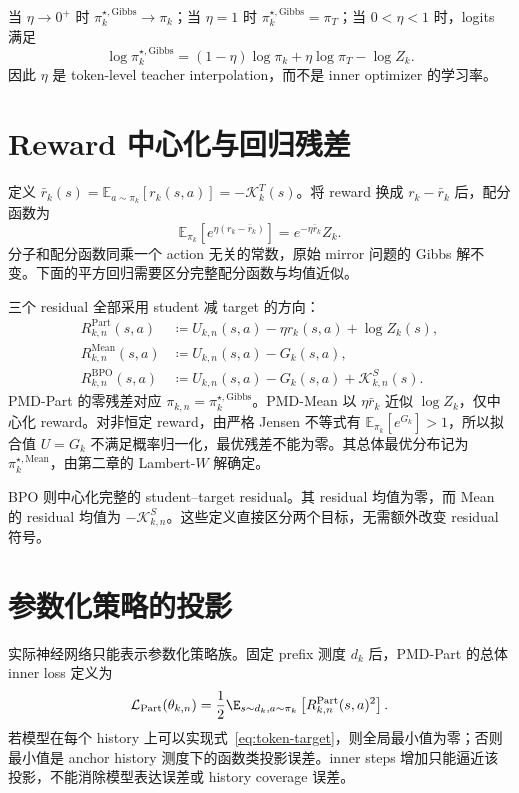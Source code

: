 \begin{corollary}[几何插值与极限]
当 $\eta\to0^+$ 时 $\pi_k^{\star,\mathrm{Gibbs}}\to\pi_k$；当 $\eta=1$ 时 $\pi_k^{\star,\mathrm{Gibbs}}=\pi_T$；当 $0<\eta<1$ 时，logits 满足
\[
 \log \pi_k^{\star,\mathrm{Gibbs}}=(1-\eta)\log\pi_k+\eta\log\pi_T-\log Z_k.
\]
因此 $\eta$ 是 token-level teacher interpolation，而不是 inner optimizer 的学习率。
\end{corollary}

\section{Reward 中心化与回归残差}

定义 $\bar r_k(s)=\mathbb E_{a\sim\pi_k}[r_k(s,a)]=-\mathcal K_k^T(s)$。将 reward 换成 $r_k-\bar r_k$ 后，配分函数为
\[
\mathbb E_{\pi_k}[e^{\eta(r_k-\bar r_k)}]=e^{-\eta\bar r_k}Z_k.
\]
分子和配分函数同乘一个 action 无关的常数，原始 mirror 问题的 Gibbs 解不变。下面的平方回归需要区分完整配分函数与均值近似。

三个 residual 全部采用 student 减 target 的方向：
\begin{align}
R^{\mathrm{Part}}_{k,n}(s,a)&\coloneqq U_{k,n}(s,a)-\eta r_k(s,a)+\log Z_k(s),\label{eq:part-residual}\\
R^{\mathrm{Mean}}_{k,n}(s,a)&\coloneqq U_{k,n}(s,a)-G_k(s,a),\label{eq:mean-residual}\\
R^{\mathrm{BPO}}_{k,n}(s,a)&\coloneqq U_{k,n}(s,a)-G_k(s,a)+\mathcal K_{k,n}^S(s).
\end{align}
PMD-Part 的零残差对应 $\pi_{k,n}=\pi_k^{\star,\mathrm{Gibbs}}$。PMD-Mean 以 $\eta\bar r_k$ 近似 $\log Z_k$，仅中心化 reward。对非恒定 reward，由严格 Jensen 不等式有 $\mathbb E_{\pi_k}[e^{G_k}]>1$，所以拟合值 $U=G_k$ 不满足概率归一化，最优残差不能为零。其总体最优分布记为 $\pi_k^{\star,\mathrm{Mean}}$，由第二章的 Lambert-$W$ 解确定。

BPO 则中心化完整的 student--target residual。其 residual 均值为零，而 Mean 的 residual 均值为 $-\mathcal K_{k,n}^S$。这些定义直接区分两个目标，无需额外改变 residual 符号。

\section{参数化策略的投影}

实际神经网络只能表示参数化策略族。固定 prefix 测度 $d_k$ 后，PMD-Part 的总体 inner loss 定义为
\begin{equation}\label{eq:part-loss}
 \mathcal L_{\mathrm{Part}}(\theta_{k,n})
 =\frac12\E_{s\sim d_k,a\sim\pi_k}
 \left[R^{\mathrm{Part}}_{k,n}(s,a)^2\right].
\end{equation}
若模型在每个 history 上可以实现式~\eqref{eq:token-target}，则全局最小值为零；否则最小值是 anchor history 测度下的函数类投影误差。inner steps 增加只能逼近该投影，不能消除模型表达误差或 history coverage 误差。
